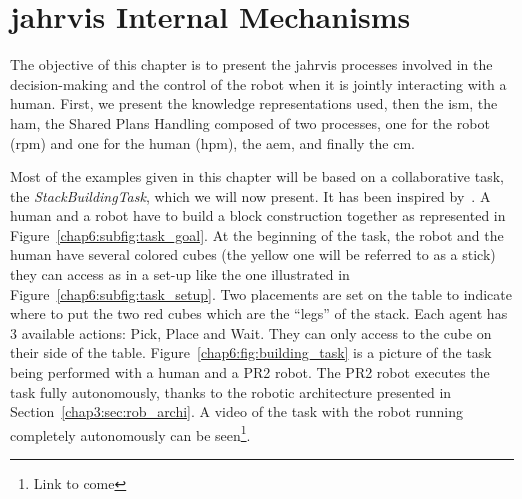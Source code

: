 \documentclass[a4paper,11pt,twoside]{StyleThese}
\begin{document}
	\setcounter{chapter}{5} %
	\dominitoc
	\faketableofcontents
	\fi

\chapter{\acrshort{jahrvis} Internal Mechanisms}\label{chapter:chap6}
\minitoc

The objective of this chapter is to present the \acrshort{jahrvis} processes involved in the decision-making and the control of the robot when it is jointly interacting with a human. First, we present the knowledge representations used, then the \acrlong{ism}, the \acrlong{ham}, the Shared Plans Handling composed of two processes, one for the robot (\acrlong{rpm}) and one for the human (\acrlong{hpm}), the \acrlong{aem}, and finally the \acrlong{cm}.

Most of the examples given in this chapter will be based on a collaborative task, the \emph{StackBuildingTask}, which we will now present. It has been inspired by~\cite{devin_2017_decisions}. A human and a robot have to build a block construction together as represented in Figure~\ref{chap6:subfig:task_goal}. At the beginning of the task, the robot and the human have several colored cubes (the yellow one will be referred to as a stick) they can access as in a set-up like the one illustrated in Figure~\ref{chap6:subfig:task_setup}. Two placements are set on the table to indicate where to put the two red cubes which are the ``legs'' of the stack. Each agent has 3 available actions: Pick, Place and Wait. They can only access to the cube on their side of the table. Figure~\ref{chap6:fig:building_task} is a picture of the task being performed with a human and a PR2 robot. The PR2 robot executes the task fully autonomously, thanks to the robotic architecture presented in Section~\ref{chap3:sec:rob_archi}. A video of the task with the robot running completely autonomously can be seen\footnote{Link to come}.
\end{document}
